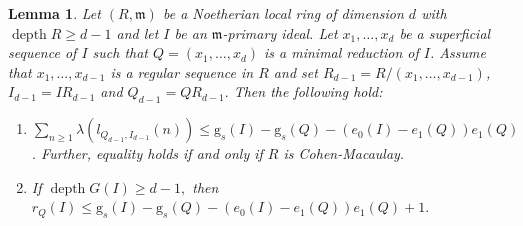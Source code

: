 \documentclass[reqno,a4paper,dvipsnames]{amsart}
\newcommand{\m}{\mathfrak{m} }
\newcommand{\depth}{\operatorname{depth}}
\newtheorem{lemma}[theorem]{Lemma}
\theoremstyle{definition}
\begin{document}
\begin{lemma} 
 \label{2-prime}
Let $(R,\m)$ be a  Noetherian local ring of dimension $d$ with $\depth R \geq d-1$ and let  $I$ be an $\m$-primary ideal. Let $x_{1}, \dots ,x_{d} $ be a superficial sequence of $I$ such that $Q=(x_{1},\ldots,x_{d})$ is a minimal reduction of $I$. Assume that $x_1,\ldots,x_{d-1}$ is a regular sequence in $R$ and    set $R_{d-1}=R/(x_{1},\ldots,x_{d-1})$, $I_{d-1}=IR_{d-1}$ and $Q_{d-1}=QR_{d-1}.$ Then the following hold:
\begin{enumerate} [\normalfont(i)]
    \item  \label{2-prime-1} $\displaystyle \sum_{n \geq 1}\lambda( l_{Q_{d-1},I_{d-1}}(n))
  \leq \mathrm{g}_{s}(I)-\mathrm{g}_{s}(Q)-(e_{0}(I)-e_{1}(Q))e_{1}(Q)$. Further, equality holds if and only if $R$ is Cohen-Macaulay. 
  \item \label{2-prime-2} If $\depth G(I) \geq d-1,$ then $r_{Q}(I) \leq \mathrm{g}_{s}(I)-\mathrm{g}_{s}(Q)-(e_{0}(I)-e_{1}(Q))e_{1}(Q)+1.$
\end{enumerate}
 \end{lemma}
\end{document}

